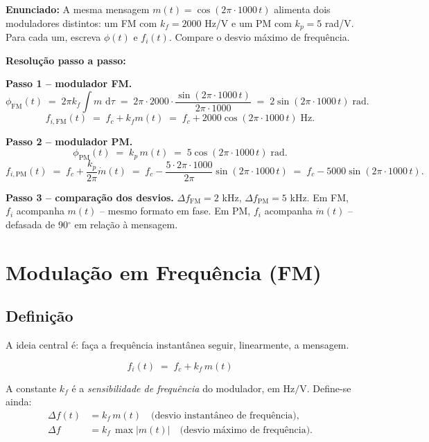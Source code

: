 \documentclass[11pt,a4paper]{article}
\newcommand{\FM}{\text{FM}}
\newcommand{\PM}{\text{PM}}
\newcommand{\dd}{\,\mathrm{d}}
\begin{document}
\begin{exercicio}
\textbf{Enunciado:} A mesma mensagem $m(t)=\cos(2\pi\!\cdot\!1000\,t)$ alimenta dois moduladores distintos: um FM com $k_f=2000$ Hz/V e um PM com $k_p=5$ rad/V. Para cada um, escreva $\phi(t)$ e $f_i(t)$. Compare o desvio máximo de frequência.

\textbf{Resolução passo a passo:}

\textbf{Passo 1 -- modulador FM.}
\[
  \phi_{\FM}(t) \;=\; 2\pi k_f\!\!\int\! m\,\dd\tau \;=\; 2\pi\!\cdot\!2000\cdot\frac{\sin(2\pi\!\cdot\!1000\,t)}{2\pi\!\cdot\!1000} \;=\; 2\sin(2\pi\!\cdot\!1000\,t)\;\text{rad}.
\]
\[
  f_{i,\FM}(t) \;=\; f_c+k_f m(t) \;=\; f_c + 2000\cos(2\pi\!\cdot\!1000\,t)\;\text{Hz}.
\]

\textbf{Passo 2 -- modulador PM.}
\[
  \phi_{\PM}(t) \;=\; k_p\,m(t) \;=\; 5\cos(2\pi\!\cdot\!1000\,t)\;\text{rad}.
\]
\[
  f_{i,\PM}(t) \;=\; f_c+\frac{k_p}{2\pi}\dot m(t) \;=\; f_c - \frac{5\cdot 2\pi\!\cdot\!1000}{2\pi}\sin(2\pi\!\cdot\!1000\,t) \;=\; f_c - 5000\sin(2\pi\!\cdot\!1000\,t).
\]

\textbf{Passo 3 -- comparação dos desvios.}
$\Delta f_{\FM}=2$ kHz, $\Delta f_{\PM}=5$ kHz. Em FM, $f_i$ acompanha $m(t)$ -- mesmo formato em fase. Em PM, $f_i$ acompanha $\dot m(t)$ -- defasada de 90$^\circ$ em relação à mensagem.
\end{exercicio}

\section{Modulação em Frequência (FM)}

\subsection{Definição}

A ideia central é: faça a frequência instantânea seguir, linearmente, a mensagem.

\[
  \boxed{\;f_i(t) \;=\; f_c + k_f\,m(t)\;}
\]

A constante $k_f$ é a \emph{sensibilidade de frequência} do modulador, em $\mathrm{Hz/V}$. Define-se ainda:
\begin{align*}
  \Delta f(t) &= k_f\,m(t) \quad\text{(desvio instantâneo de frequência),}\\
  \Delta f    &= k_f\,\max|m(t)| \quad\text{(desvio máximo de frequência).}
\end{align*}
\end{document}
